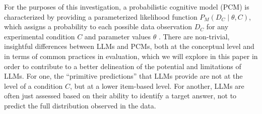 \documentclass[fleqn]{article}
\begin{document}
For the purposes of this investigation, a probabilistic cognitive model (PCM) is characterized by providing a parameterized likelihood function $P_{M}(D_{C} \mid \theta, C)$, which assigns a probability to each possible data observation $D_{C}$ for any experimental condition $C$ and parameter values $\theta$ \citep[e.g.,][]{LewandowskyFarrell2011:Computational-M,LeeWagenmakers2013:Bayesian-Cognit}.
There are non-trivial, insightful differences between LLMs and PCMs, both at the conceptual level and in terms of common practices in evaluation, which we will explore in this paper in order to contribute to a better delineation of the potential and limitations of LLMs.
For one, the ``primitive predictions'' that LLMs provide are not at the level of a condition $C$, but at a lower item-based level.
For another, LLMs are often just assessed based on their ability to identify a target answer, not to predict the full distribution observed in the data.
\end{document}

